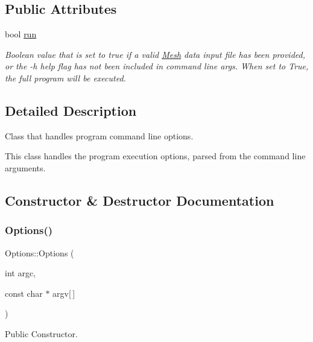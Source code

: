 \subsection*{Public Attributes}
\begin{DoxyCompactItemize}
\item 
bool \mbox{\hyperlink{class_options_a762a0775c9b60ceb2737dc90c96f7c0b}{run}}
\begin{DoxyCompactList}\small\item\em Boolean value that is set to true if a valid \mbox{\hyperlink{class_mesh}{Mesh}} data input file has been provided, or the -\/h help flag has not been included in command line args. When set to True, the full program will be executed. \end{DoxyCompactList}\end{DoxyCompactItemize}


\subsection{Detailed Description}
Class that handles program command line options. 

This class handles the program execution options, parsed from the command line arguments. 

\subsection{Constructor \& Destructor Documentation}
\mbox{\label{class_options_af65f2f452a673db877590dbff53115ff}} 
\subsubsection{\texorpdfstring{Options()}{Options()}}
{\footnotesize\ttfamily Options\+::\+Options (\begin{DoxyParamCaption}\item[{int}]{argc,  }\item[{const char $\ast$}]{argv\mbox{[}$\,$\mbox{]} }\end{DoxyParamCaption})}



Public Constructor. 


